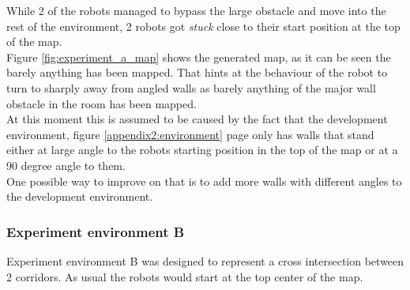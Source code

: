 While 2 of the robots managed to bypass the large obstacle and move into the rest of the environment, 2 robots got \textit{stuck} close to their start position at the top of the map. \\
Figure \ref{fig:experiment_a_map} shows the generated map, as it can be seen the barely anything has been mapped. That hints at the behaviour of the robot to turn to sharply away from angled walls as barely anything of the major wall obstacle in the room has been mapped. \\
At this moment this is assumed to be caused by the fact that the development environment, figure \ref{appendix2:environment} page \pageref{appendix2:environment} only has walls that stand either at large angle to the robots starting position in the top of the map or at a 90 degree angle to them.\\
One possible way to improve on that is to add more walls with different angles to the development environment. 

\subsubsection{Experiment environment B}
Experiment environment B was designed to represent a cross intersection between 2 corridors. As usual the robots would start at the top center of the map. 

